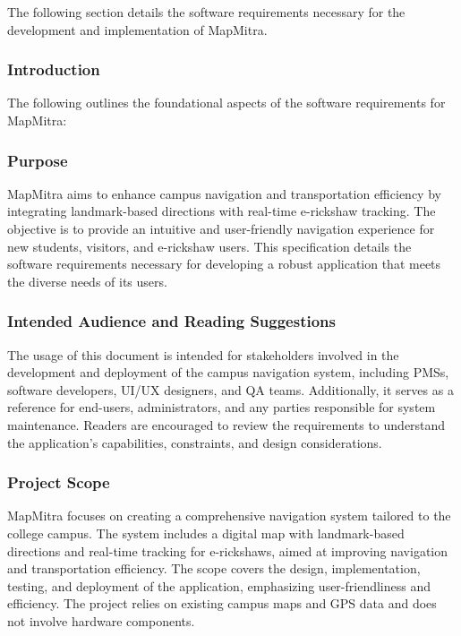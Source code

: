 The following section details the software requirements necessary for the development and implementation of MapMitra.

\subsubsection{Introduction}

The following outlines the foundational aspects of the software requirements for MapMitra:

\subsubsection*{Purpose}
MapMitra aims to enhance campus navigation and transportation efficiency by integrating landmark-based directions with real-time e-rickshaw tracking. The objective is to provide an intuitive and user-friendly navigation experience for new students, visitors, and e-rickshaw users. This specification details the software requirements necessary for developing a robust application that meets the diverse needs of its users.

\subsubsection*{Intended Audience and Reading Suggestions}
The usage of this document is intended for stakeholders involved in the development and deployment of the campus navigation system, including PMSs, software developers, UI/UX designers, and QA teams. Additionally, it serves as a reference for end-users, administrators, and any parties responsible for system maintenance. Readers are encouraged to review the requirements to understand the application's capabilities, constraints, and design considerations.

\subsubsection*{Project Scope}
MapMitra focuses on creating a comprehensive navigation system tailored to the college campus. The system includes a digital map with landmark-based directions and real-time tracking for e-rickshaws, aimed at improving navigation and transportation efficiency. The scope covers the design, implementation, testing, and deployment of the application, emphasizing user-friendliness and efficiency. The project relies on existing campus maps and GPS data and does not involve hardware components.

